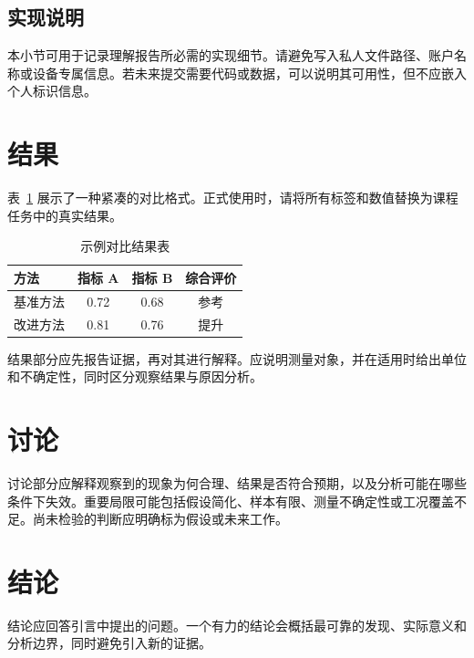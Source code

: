 \documentclass[11pt,a4paper,UTF8,fontset=fandol]{ctexart}
\begin{document}
\subsection{实现说明}
本小节可用于记录理解报告所必需的实现细节。请避免写入私人文件路径、账户名称或设备专属信息。若未来提交需要代码或数据，可以说明其可用性，但不应嵌入个人标识信息。

\section{结果}
表~\ref{tab:example} 展示了一种紧凑的对比格式。正式使用时，请将所有标签和数值替换为课程任务中的真实结果。

\begin{table}[htbp]
  \centering
  \caption{示例对比结果表}
  \label{tab:example}
  \begin{tabular}{lccc}
    \toprule
    方法 & 指标 A & 指标 B & 综合评价 \\
    \midrule
    基准方法 & 0.72 & 0.68 & 参考 \\
    改进方法 & 0.81 & 0.76 & 提升 \\
    \bottomrule
  \end{tabular}
\end{table}

结果部分应先报告证据，再对其进行解释。应说明测量对象，并在适用时给出单位和不确定性，同时区分观察结果与原因分析。

\section{讨论}
讨论部分应解释观察到的现象为何合理、结果是否符合预期，以及分析可能在哪些条件下失效。重要局限可能包括假设简化、样本有限、测量不确定性或工况覆盖不足。尚未检验的判断应明确标为假设或未来工作。

\section{结论}
结论应回答引言中提出的问题。一个有力的结论会概括最可靠的发现、实际意义和分析边界，同时避免引入新的证据。
\end{document}
